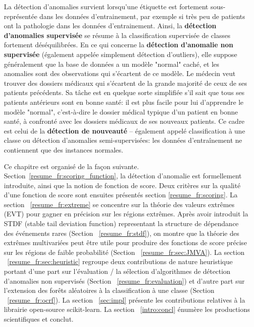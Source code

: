 La détection d'anomalies survient lorsqu'une étiquette est fortement sous-représentée dans les données d'entrainement, par exemple si très peu de patients ont la pathologie dans les données d'entrainement.
Ainsi, la \textbf{détection d'anomalies supervisée} se résume à la classification supervisée de classes fortement déséquilibrées.
En ce qui concerne la \textbf {détection d'anomalie non supervisée} (également appelée simplement détection d'outliers), elle suppose généralement que la base de données a un modèle "normal" caché, et les anomalies sont des observations qui s'écartent de ce modèle. Le médecin veut trouver des dossiers médicaux qui s'écartent de la grande majorité de ceux de ses patients précédents.
%
Sa tâche est en quelque sorte simplifiée s'il sait que tous ses patients antérieurs sont en bonne santé: il est plus facile pour lui d'apprendre le modèle "normal", c'est-à-dire le dossier médical typique d'un patient en bonne santé, à confronté avec les dossiers médicaux de ses nouveaux patients. Ce cadre est celui de la \textbf {détection de nouveauté} -- également appelé classification à une classe ou détection d'anomalies semi-supervisées: les données d'entraînement ne contiennent que des instances normales.

Ce chapitre est organisé de la façon suivante.
Section~\ref{resume_fr:scoring_function}, la détection d'anomalie est formellement introduite, ainsi que la notion de fonction de score.
Deux critères sur la qualité d'une fonction de score sont ensuites présentés section \ref{resume_fr:scoring}.
La section ~\ref{resume_fr:extreme} se concentre sur la théorie des valeurs extrêmes (EVT) pour gagner en précision sur les régions extrêmes. Après avoir introduit la STDF (stable tail deviation function) representant la structure de dépendance des événements rares (Section ~\ref{resume_fr:stdf}), on montre que la théorie des extrêmes multivariées peut être utile pour produire des fonctions de score précise sur les régions de faible probabilité (Section ~\ref{resume_fr:sec:JMVA}).
La section ~\ref{resume_fr:sec:heuristic} regroupe deux contributions de nature heuristique portant d'une part sur l'évaluation / la sélection d'algorithmes de détection d'anomalies non supervisés (Section ~\ref{resume_fr:evaluation}) et d'autre part sur l'extension des forêts aléatoires à la classification à une classe (Section ~\ref{resume_fr:ocrf}). La section ~\ref{sec:impl} présente les contributions relatives à la librairie open-source scikit-learn. La section ~\ref{intro:concl} énumère les productions scientifiques et conclut.


